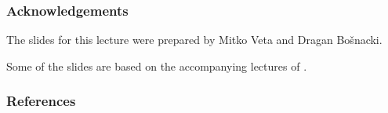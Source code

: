 \documentclass[notes]{beamer}          %
\begin{document}
\fi %

\begin{frame}
\frametitle{Acknowledgements}

The slides for this lecture were prepared by Mitko Veta and Dragan Bo{\v s}nacki. 

Some of the slides are based on the accompanying lectures of \cite{deeplearning}.

\end{frame}


\begin{frame}
\frametitle{References}
\printbibliography
\end{frame}
\end{document}
